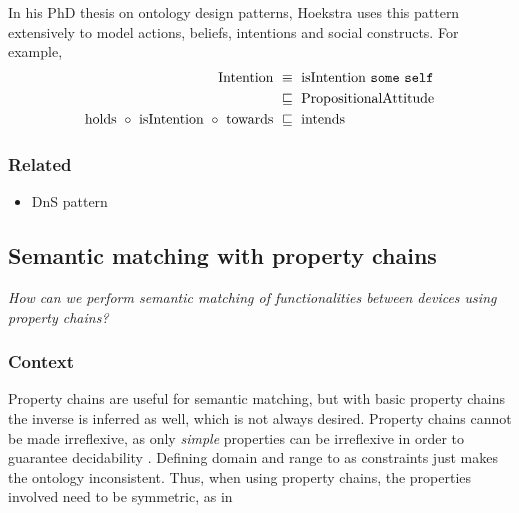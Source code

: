 In his PhD thesis on ontology design patterns, Hoekstra \cite{Hoekstra2009} uses this pattern extensively to model actions, beliefs, intentions and social constructs. For example,\\

\noindent
\begin{align*}
\text{Intention}~\ensuremath{&\equiv}~\text{isIntention}~\texttt{some}~\texttt{self}\\
\ensuremath{&\sqsubseteq}~\text{PropositionalAttitude}\\
\text{holds}~\ensuremath{\circ}~\text{isIntention}~\ensuremath{\circ}~\text{towards}~\ensuremath{&\sqsubseteq}~\text{intends}
\end{align*}

\subsubsection{Related}

\begin{itemize}
	\item \ac{DnS} pattern
\end{itemize}




\subsection{Semantic matching with property chains}
\label{SemanticMatchingChains}

\emph{How can we perform semantic matching of functionalities between devices using property chains?}

\subsubsection{Context}

Property chains are useful for semantic matching, but with basic property chains the inverse is inferred as well, which is not always desired. Property chains cannot be made irreflexive, as only \emph{simple} properties can be irreflexive in order to guarantee decidability \cite{Bao2009}. Defining domain and range to as constraints just makes the ontology inconsistent. Thus, when using property chains, the properties involved need to be symmetric, as in\\ 

